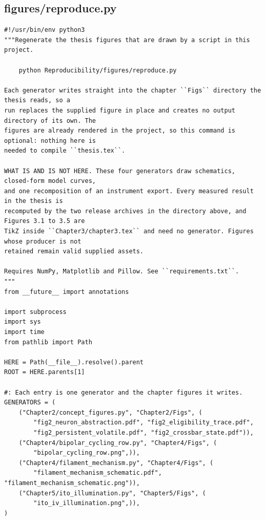 \documentclass[a4paper,10pt]{article}
\begin{document}
\subsection{figures/reproduce.py}
\begin{Verbatim}
#!/usr/bin/env python3
"""Regenerate the thesis figures that are drawn by a script in this project.

    python Reproducibility/figures/reproduce.py

Each generator writes straight into the chapter ``Figs`` directory the thesis reads, so a
run replaces the supplied figure in place and creates no output directory of its own. The
figures are already rendered in the project, so this command is optional: nothing here is
needed to compile ``thesis.tex``.

WHAT IS AND IS NOT HERE. These four generators draw schematics, closed-form model curves,
and one recomposition of an instrument export. Every measured result in the thesis is
recomputed by the two release archives in the directory above, and Figures 3.1 to 3.5 are
TikZ inside ``Chapter3/chapter3.tex`` and need no generator. Figures whose producer is not
retained remain valid supplied assets.

Requires NumPy, Matplotlib and Pillow. See ``requirements.txt``.
"""
from __future__ import annotations

import subprocess
import sys
import time
from pathlib import Path

HERE = Path(__file__).resolve().parent
ROOT = HERE.parents[1]

#: Each entry is one generator and the chapter figures it writes.
GENERATORS = (
    ("Chapter2/concept_figures.py", "Chapter2/Figs", (
        "fig2_neuron_abstraction.pdf", "fig2_eligibility_trace.pdf",
        "fig2_persistent_volatile.pdf", "fig2_crossbar_state.pdf")),
    ("Chapter4/bipolar_cycling_row.py", "Chapter4/Figs", (
        "bipolar_cycling_row.png",)),
    ("Chapter4/filament_mechanism.py", "Chapter4/Figs", (
        "filament_mechanism_schematic.pdf", "filament_mechanism_schematic.png")),
    ("Chapter5/ito_illumination.py", "Chapter5/Figs", (
        "ito_iv_illumination.png",)),
)



\end{Verbatim}
\end{document}
